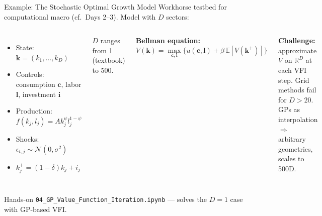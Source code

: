 \documentclass[aspectratio=169,11pt]{beamer}
\newcommand{\emphc}[1]{\textcolor{harvardcrimson}{#1}}
\newcommand{\R}{\mathbb{R}}
\newcommand{\E}[1]{\mathbb{E}\!\left[#1\right]}
\begin{document}
\begin{frame}{Example: The Stochastic Optimal Growth Model}
\small
Workhorse testbed for computational macro (cf.\ Days 2--3). Model with $D$ sectors:

\vspace{0.2em}
\begin{columns}[T]
\begin{itemize}\itemsep0pt
    \item State: $\bm{k} = (k_1, \ldots, k_D)$
    \item Controls: consumption $\bm{c}$, labor $\bm{l}$, investment $\bm{i}$
    \item Production: $f(k_j, l_j) = A k_j^\psi l_j^{1-\psi}$
    \item Shocks: $\epsilon_{t,j} \sim \mathcal{N}(0, \sigma^2)$
    \item $k_{j}^+ = (1-\delta) k_j + i_j$
\end{itemize}

\vspace{0.2em}
$D$ ranges from 1 (textbook) to \emphc{500}.

\textbf{Bellman equation:}
\[
V(\bm{k}) = \max_{\bm{c}, \bm{l}} \bigl\{ u(\bm{c}, \bm{l}) + \beta\, \E{V(\bm{k}^+)} \bigr\}
\]

\textbf{Challenge:} approximate $V$ on $\R^D$ at each VFI step. Grid methods fail for $D > 20$. \emphc{GPs as interpolation} $\Rightarrow$ arbitrary geometries, scales to 500D.
\end{columns}

\vspace{0.3em}
\begin{block}{Hands-on}
\small \texttt{04\_GP\_Value\_Function\_Iteration.ipynb} --- solves the $D=1$ case with GP-based VFI.
\end{block}
\end{frame}
\end{document}
